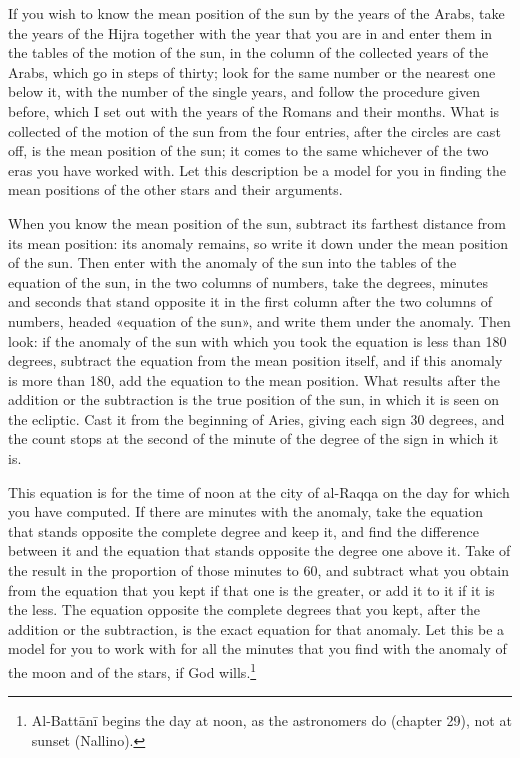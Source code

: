 \documentclass[11pt]{article}
\begin{document}
\par If you wish to know the mean position of the sun by the years of the Arabs, take the years of the Hijra together with the year that you are in and enter them in the tables of the motion of the sun, in the column of the collected years of the Arabs, which go in steps of thirty; look for the same number or the nearest one below it, with the number of the single years, and follow the procedure given before, which I set out with the years of the Romans and their months. What is collected of the motion of the sun from the four entries, after the circles are cast off, is the mean position of the sun; it comes to the same whichever of the two eras you have worked with. Let this description be a model for you in finding the mean positions of the other stars and their arguments.\par
\par When you know the mean position of the sun, subtract its farthest distance from its mean position: its anomaly remains, so write it down under the mean position of the sun. Then enter with the anomaly of the sun into the tables of the equation of the sun, in the two columns of numbers, take the degrees, minutes and seconds that stand opposite it in the first column after the two columns of numbers, headed «equation of the sun», and write them under the anomaly. Then look: if the anomaly of the sun with which you took the equation is less than 180 degrees, subtract the equation from the mean position itself, and if this anomaly is more than 180, add the equation to the mean position. What results after the addition or the subtraction is the true position of the sun, in which it is seen on the ecliptic. Cast it from the beginning of Aries, giving each sign 30 degrees, and the count stops at the second of the minute of the degree of the sign in which it is.\par
\par This equation is for the time of noon at the city of al-Raqqa on the day for which you have computed. If there are minutes with the anomaly, take the equation that stands opposite the complete degree and keep it, and find the difference between it and the equation that stands opposite the degree one above it. Take of the result in the proportion of those minutes to 60, and subtract what you obtain from the equation that you kept if that one is the greater, or add it to it if it is the less. The equation opposite the complete degrees that you kept, after the addition or the subtraction, is the exact equation for that anomaly. Let this be a model for you to work with for all the minutes that you find with the anomaly of the moon and of the stars, if God wills.\footnote{Al-Battānī begins the day at noon, as the astronomers do (chapter 29), not at sunset (Nallino).}\par
\end{document}
